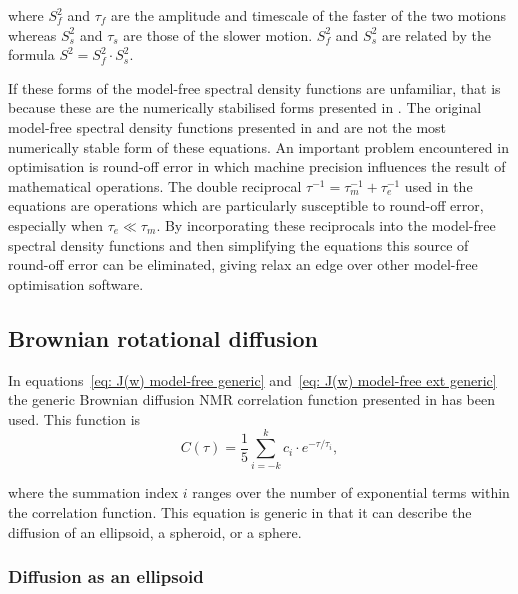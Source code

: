\noindent where $S^2_f$ and $\tau_f$ are the amplitude and timescale of the faster of the two motions whereas $S^2_s$ and $\tau_s$ are those of the slower motion.
$S^2_f$ and $S^2_s$ are related by the formula $S^2 = S^2_f \cdot S^2_s$.

If these forms of the model-free spectral density functions are unfamiliar, that is because these are the numerically stabilised forms presented in \citet{dAuvergneGooley08a}.
The original model-free spectral density functions presented in \citet{LipariSzabo82a} and \citet{Clore90a} are not the most numerically stable form of these equations.
An important problem encountered in optimisation is round-off error in which machine precision influences the result of mathematical operations.
The double reciprocal $\tau^{-1} = \tau_m^{-1} + \tau_e^{-1}$ used in the equations are operations which are particularly susceptible to round-off error, especially when $\tau_e \ll \tau_m$.
By incorporating these reciprocals into the model-free spectral density functions and then simplifying the equations this source of round-off error can be eliminated, giving relax an edge over other model-free optimisation software.


\subsection{Brownian rotational diffusion}

In equations~\eqref{eq: J(w) model-free generic} and~\eqref{eq: J(w) model-free ext generic} the generic Brownian diffusion NMR correlation function presented in \citet{dAuvergne06} has been used.
This function is
\begin{equation} \label{eq: C(tau) generic}
    C(\tau) = \frac{1}{5} \sum_{i=-k}^k c_i \cdot e^{-\tau/\tau_i},
\end{equation}

\noindent where the summation index $i$ ranges over the number of exponential terms within the correlation function.
This equation is generic in that it can describe the diffusion of an ellipsoid, a spheroid, or a sphere.



\subsubsection{Diffusion as an ellipsoid}


